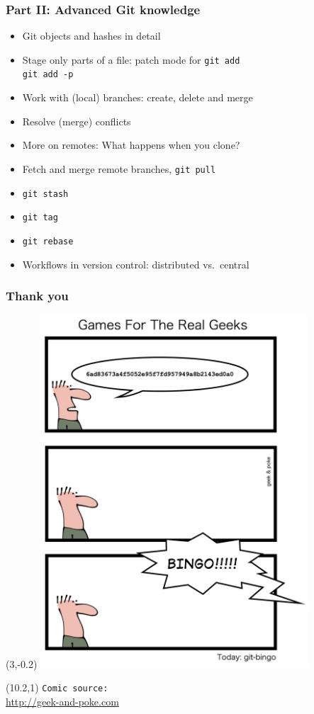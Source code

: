 \documentclass[handout,notes]{gittalk}
\newcommand{\hlcommand}[1]{ %
\colorbox{base3}{\small \texttt{#1}}
}
\begin{document}
\begin{frame}
\frametitle{Part II: Advanced Git knowledge}
\begin{itemize}
  \item Git objects and hashes in detail
  \item Stage only parts of a file: patch mode for \texttt{git add} \\
  \hlcommand{git add -p}
  \item Work with (local) branches: create, delete and merge
  \item Resolve (merge) conflicts
  \item More on remotes: What happens when you clone?
  \item Fetch and merge remote branches, \hlcommand{git pull}
  \item \hlcommand{git stash}
  \item \hlcommand{git tag}
  \item \hlcommand{git rebase}
  \item Workflows in version control: distributed vs.~central
\end{itemize}
\end{frame}

\begin{frame}
\frametitle{Thank you}
\begin{textblock}{10}(3,-0.2)
  \includegraphics[width=0.75\textwidth]{./img/git-bingo.jpg}
\end{textblock}
\begin{textblock}{6}(10.2,1)
  \footnotesize
  \texttt{Comic source:}\\
  \url{http://geek-and-poke.com}
\end{textblock}
\end{frame}

\end{document}
